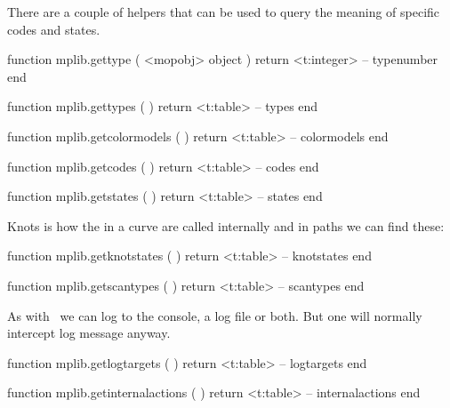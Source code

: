 \stopsection

\startsection[title=Internals]

There are a couple of helpers that can be used to query the meaning of specific
codes and states.

\starttyping[option=LUA]
function mplib.gettype ( <mopobj> object )
    return <t:integer> -- typenumber
end
\stoptyping

\starttyping[option=LUA]
function mplib.gettypes ( )
    return <t:table> -- types
end
\stoptyping

\startfourrows
\stopfourrows

\starttyping[option=LUA]
function mplib.getcolormodels ( )
    return <t:table> -- colormodels
end
\stoptyping

\startfourrows
\stopfourrows

\starttyping[option=LUA]
function mplib.getcodes ( )
    return <t:table> -- codes
end
\stoptyping

\startfourrows
\stopfourrows

\starttyping[option=LUA]
function mplib.getstates ( )
    return <t:table> -- states
end
\stoptyping

\startfourrows
\stopfourrows

Knots is how the  in a curve are called internally and in paths we
can find these:

\starttyping[option=LUA]
function mplib.getknotstates ( )
    return <t:table> -- knotstates
end
\stoptyping

\startfourrows
\stopfourrows

\starttyping[option=LUA]
function mplib.getscantypes ( )
    return <t:table> -- scantypes
end
\stoptyping

\startfourrows
\stopfourrows

As with \TEX\ we can log to the console, a log file or both. But one will normally
intercept log message anyway.

\starttyping[option=LUA]
function mplib.getlogtargets ( )
    return <t:table> -- logtargets
end
\stoptyping

\startfourrows
\stopfourrows

\starttyping[option=LUA]
function mplib.getinternalactions ( )
    return <t:table> -- internalactions
end
\stoptyping

